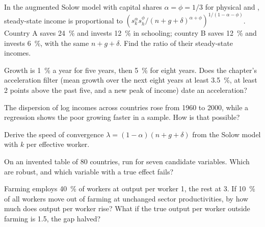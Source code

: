 \begin{exercise}[$\star\star$]\label{exo:b3:growth-empirics:7}
In the augmented Solow model with capital shares $\alpha = \phi = 1/3$ for physical and , steady-state income is proportional to
$(s_k^{\alpha}s_h^{\phi}/(n + g + \delta)^{\alpha + \phi})^{1/(1 - \alpha - \phi)}$. Country A saves 24~\% and invests 12~\% in schooling; country B saves 12~\% and
invests 6~\%, with the same $n + g + \delta$. Find the ratio of their steady-state incomes.
\end{exercise}

\begin{exercise}[$\star\star$]\label{exo:b3:growth-empirics:8}
Growth is 1~\% a year for five years, then 5~\% for eight years. Does the chapter's
acceleration filter (mean growth over the next eight years at least 3.5~\%, at least 2 points above
the past five, and a new peak of income) date an acceleration?
\end{exercise}

\begin{exercise}[$\star\star$]\label{exo:b3:growth-empirics:9}
The dispersion of log incomes across countries rose from 1960 to 2000, while a regression
shows the poor growing faster in a sample. How is that possible?
\end{exercise}

\begin{exercise}[$\star\star\star$]\label{exo:b3:growth-empirics:10}
Derive the speed of convergence $\lambda = (1 - \alpha)(n + g + \delta)$ from the Solow model with $k$ per effective worker.
\end{exercise}

\begin{exercise}[$\star\star\star$]\label{exo:b3:growth-empirics:11}
On an invented table of 80 countries, run  for seven candidate
variables. Which are robust, and which variable with a true effect fails?
\end{exercise}

\begin{exercise}[$\star\star\star$]\label{exo:b3:growth-empirics:12}
Farming employs 40~\% of workers at output per worker 1, the rest at 3. If 10~\% of all workers move
out of farming at unchanged sector productivities, by how much does output per worker
rise? What if the true output per worker outside farming is 1.5, the gap halved?
\end{exercise}


